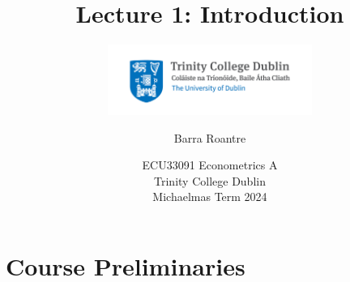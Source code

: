\documentclass[11pt,english]{beamer}
\subtitle{
    \includegraphics[width=0.50\textwidth]{TCDlogo.jpg}
}
\begin{document}
\begin{frame}[noframenumbering]{}
\vspace{0.5cm}
\title[]{Lecture 1: Introduction}
\author{Barra Roantre}
\date{ECU33091 Econometrics A \\ Trinity College Dublin \\ Michaelmas Term 2024} 
\titlepage {\small{}\ }\thispagestyle{empty} \vspace{-30pt}

\end{frame}
 



\section{Course Preliminaries}
\end{document}
